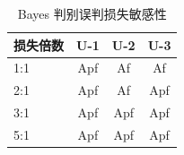 \begin{table}[H]
    \centering
    \caption{Bayes 判别误判损失敏感性}
    \label{tab:bayes_sensitivity}
    \renewcommand{\arraystretch}{1.25}
    \begin{tabular}{lccc}
        \toprule
        损失倍数 & U-1 & U-2 & U-3 \\
        \midrule
        1:1 & Apf & Af & Af \\
2:1 & Apf & Af & Apf \\
3:1 & Apf & Apf & Apf \\
5:1 & Apf & Apf & Apf \\
        \bottomrule
    \end{tabular}
\end{table}
